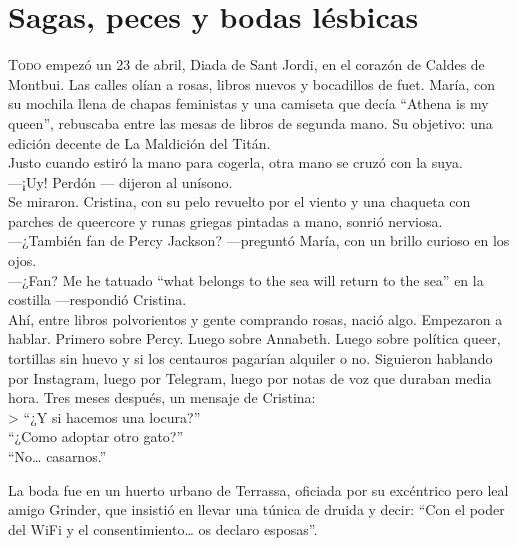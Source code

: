 \chapter{Sagas, peces y bodas lésbicas}


\lettrine[loversize=0.2, lines=2]{T}{odo} empezó un 23 de abril, Diada de Sant Jordi, en el corazón de Caldes de Montbui. Las calles olían a rosas, libros nuevos y bocadillos de fuet. María, con su mochila llena de chapas feministas y una camiseta que decía “Athena is my queen”, rebuscaba entre las mesas de libros de segunda mano. Su objetivo: una edición decente de La Maldición del Titán.\\

Justo cuando estiró la mano para cogerla, otra mano se cruzó con la suya.\\

—¡Uy! Perdón — dijeron al unísono.\\

Se miraron. Cristina, con su pelo revuelto por el viento y una chaqueta con parches de queercore y runas griegas pintadas a mano, sonrió nerviosa.\\

—¿También fan de Percy Jackson? —preguntó María, con un brillo curioso en los ojos.\\

—¿Fan? Me he tatuado “what belongs to the sea will return to the sea” en la costilla —respondió Cristina.\\

Ahí, entre libros polvorientos y gente comprando rosas, nació algo. Empezaron a hablar. Primero sobre Percy. Luego sobre Annabeth. Luego sobre política queer, tortillas sin huevo y si los centauros pagarían alquiler o no. Siguieron hablando por Instagram, luego por Telegram, luego por notas de voz que duraban media hora. Tres meses después, un mensaje de Cristina:\\

> “¿Y si hacemos una locura?”\\

“¿Como adoptar otro gato?”\\

“No… casarnos.”\\

\saltescena

La boda fue en un huerto urbano de Terrassa, oficiada por su excéntrico pero leal amigo Grinder, que insistió en llevar una túnica de druida y decir: “Con el poder del WiFi y el consentimiento… os declaro esposas”.\\


